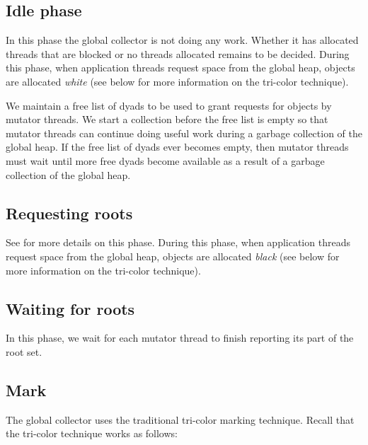 \subsection{Idle phase}

In this phase the global collector is not doing any work.  Whether it
has allocated threads that are blocked or no threads allocated
remains to be decided.  During this phase, when application threads
request space from the global heap, objects are allocated \emph{white}
(see below for more information on the tri-color technique).

We maintain a free list of dyads to be used to grant requests for
objects by mutator threads.  We start a collection before the free
list is empty so that mutator threads can continue doing useful work
during a garbage collection of the global heap.  If the free list of
dyads ever becomes empty, then mutator threads must wait until more
free dyads become available as a result of a garbage collection of the
global heap.


\subsection{Requesting roots}


See 
for more details on this phase.  During this phase, when application
threads request space from the global heap, objects are allocated
\emph{black} (see below for more information on the tri-color
technique).

\subsection{Waiting for roots}

In this phase, we wait for each mutator thread to finish reporting its
part of the root set.

\subsection{Mark}

The global collector uses the traditional tri-color marking
technique.  Recall that the tri-color technique works as follows:

